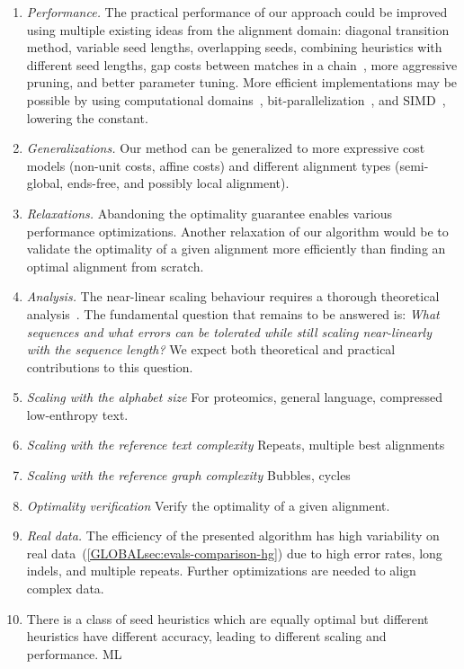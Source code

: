 \begin{enumerate}
    \item \emph{Performance.} The practical performance of our \A approach could
        be improved using multiple existing ideas from the alignment domain:
        diagonal transition method, variable seed lengths, overlapping seeds,
        combining heuristics with different seed lengths, gap costs between
        matches in a chain~\citep{ukkonen1985algorithms,wilbur1984context}, more
        aggressive pruning, and better parameter tuning. More efficient
        implementations may be possible by using computational
        domains~\citep{spouge1989speeding}, bit-parallelization~\citep{myers1999fast},
        and SIMD~\citep{marco2021fast}, lowering the \A constant.
    \item \emph{Generalizations.} Our method can be generalized to more
        expressive cost models (non-unit costs, affine costs) and different alignment
        types (semi-global, ends-free, and possibly local alignment).
    \item \emph{Relaxations.} Abandoning the optimality guarantee
        enables various performance optimizations. Another relaxation
        of our algorithm would be to validate the optimality of a given alignment more
        efficiently than finding an optimal alignment from scratch.
    \item \emph{Analysis.} The near-linear scaling behaviour requires a thorough
        theoretical analysis~\citep{medvedev2022limitations}. The fundamental
        question that remains to be answered is: \emph{What sequences and what
        errors can be tolerated while still scaling near-linearly with the
        sequence length?} We expect both theoretical and practical contributions
        to this question.
    \item \emph{Scaling with the alphabet size} For proteomics, general
        language, compressed low-enthropy text.
    \item \emph{Scaling with the reference text complexity} Repeats, multiple
        best alignments
    \item \emph{Scaling with the reference graph complexity} Bubbles, cycles
    \item \emph{Optimality verification} Verify the optimality of a given alignment.
    \item \emph{Real data.} The efficiency of the presented algorithm has high
        variability on real data~(\cref{GLOBALsec:evals-comparison-hg}) due to
        high error rates, long indels, and multiple repeats. Further
        optimizations are needed to align complex data.
    \item There is a class of seed heuristics which are equally optimal but
        different heuristics have different accuracy, leading to different \A
        scaling and performance. ML
\end{enumerate}

